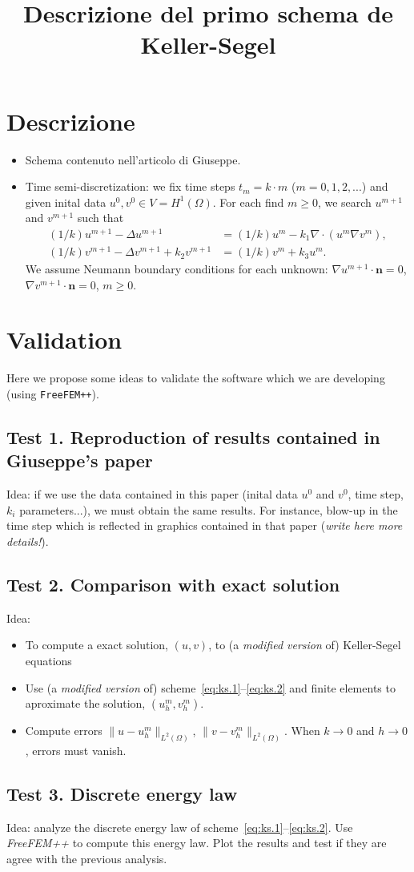 \documentclass[a4wide]{article}
\title{Descrizione del primo schema de Keller-Segel}
\newcommand{\um}{u^m}
\newcommand{\umm}{u^{m+1}}
\newcommand{\vm}{v^m}
\newcommand{\vmm}{v^{m+1}}
\newcommand{\grad}{\nabla}
\renewcommand{\div}{\nabla\cdot}
\newcommand{\nn}{\mathbf{n}}
\begin{document}
\maketitle

\section{Descrizione}

\begin{itemize}
\item Schema contenuto nell'articolo di Giuseppe.
\item Time
  semi-discretization: we fix time steps $t_m=k\cdot m$
  ($m=0,1,2,...$) and given inital data $u^0,v^0 \in
  V=H^1(\Omega)$.
  For each find $m\ge 0$, we search $\umm$ and $\vmm$ such that
  \begin{align}
    \label{eq:ks.1}
    (1/k) \umm - \Delta \umm &= (1/k) \um - k_1 \div(\um \grad \vm),
    \\
    \label{eq:ks.2}
    (1/k) \vmm - \Delta \vmm + k_2 \vmm &= (1/k) \vm + k_3 \um.
  \end{align}
  We assume Neumann boundary conditions for each unknown:
  $\grad \umm \cdot \nn=0$, $\grad \vmm \cdot \nn=0$, $m\ge 0$.
\end{itemize}

\section{Validation}
Here we propose some ideas to validate the software
which we are developing (using \texttt{FreeFEM++}).

\subsection*{Test 1. Reproduction of results contained in Giuseppe's paper}

Idea: if we use the data contained in this paper (inital data $u^0$
and $v^0$, time step, $k_i$ parameters...), we must obtain the same
results. For instance, blow-up in the time step which is reflected in
graphics contained in that paper (\textit{write here more details!}).

\subsection*{Test 2. Comparison with exact solution}

Idea:
\begin{itemize}
\item To compute a exact solution, $(u,v)$, to (a \textit{modified version} of)
  Keller-Segel equations
\item Use (a \textit{modified version} of)
  scheme~\eqref{eq:ks.1}--\eqref{eq:ks.2} and finite elements to
  aproximate the solution, $(\um_h, \vm_h)$.
\item Compute errors $\|u-\um_h\|_{L^2(\Omega)}$,
  $\|v-\vm_h\|_{L^2(\Omega)}$. When $k\to 0$ and $h\to 0$, errors must
  vanish.
\end{itemize}

\subsection*{Test 3. Discrete energy law}

Idea: analyze the discrete energy law of
scheme~\eqref{eq:ks.1}--\eqref{eq:ks.2}. Use \textit{FreeFEM++} to
compute this energy law. Plot the results and test if they are
agree with the previous analysis.
\end{document}

